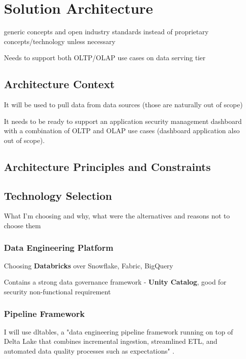 \chapter{Solution Architecture}
\label{ch:architecture}

generic concepts and open industry standards instead of proprietary concepts/technology unless necessary

Needs to support both OLTP/OLAP use cases on data serving tier 

\section{Architecture Context}

It will be used to pull data from data sources (those are naturally out of scope)

It needs to be ready to support an application security management dashboard with a combination of OLTP and OLAP use cases (dashboard application also out of scope).

\section{Architecture Principles and Constraints}


\section{Technology Selection}

What I'm choosing and why, what were the alternatives and reasons not to choose them

\subsection{Data Engineering Platform}

Choosing \textbf{Databricks} over Snowflake, Fabric, BigQuery

Contains a strong data governance framework - \textbf{Unity Catalog}, good for security non-functional requirement

\subsection{Pipeline Framework}

I will use \gls{dltables}, a "data engineering pipeline framework running on top of Delta Lake that combines incremental ingestion, streamlined ETL, and automated data quality processes such as expectations" \cite{Lee2024}.

